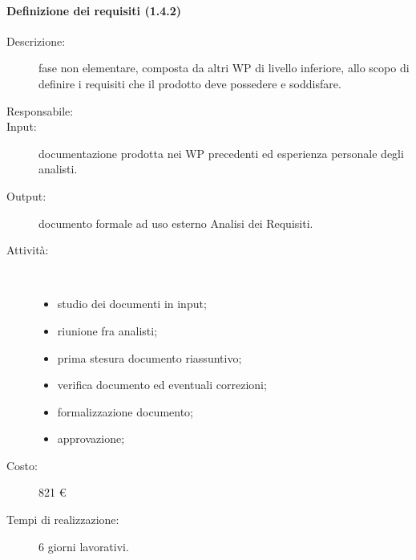 \paragraph{Definizione dei requisiti (1.4.2)}
\begin{description}
\item[Descrizione:] fase non elementare, composta da altri WP di livello inferiore, allo scopo di definire i requisiti che il prodotto deve possedere e soddisfare.
\item[Responsabile:] 
\item[Input:] documentazione prodotta nei WP precedenti ed esperienza personale degli analisti.
\item[Output:] documento formale ad uso esterno Analisi dei Requisiti.
\item[Attività:]\mbox{}\\[-1.5\baselineskip]
	\begin{itemize}
	\item studio dei documenti in input;
	\item riunione fra analisti;
	\item prima stesura documento riassuntivo;
	\item verifica documento ed eventuali correzioni;
	\item formalizzazione documento;
	\item approvazione;
	\end{itemize}
\item[Costo:] 821 \euro{}
\item[Tempi di realizzazione:] 6 giorni lavorativi.
\end{description}

